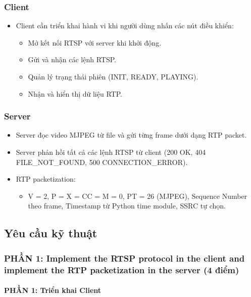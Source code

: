 \subsubsection{Client}
\begin{itemize}
    \item Client cần triển khai hành vi khi người dùng nhấn các nút điều khiển:
    \begin{itemize}
        \item Mở kết nối RTSP với server khi khởi động.
        \item Gửi và nhận các lệnh RTSP.
        \item Quản lý trạng thái phiên (INIT, READY, PLAYING).
        \item Nhận và hiển thị dữ liệu RTP.
    \end{itemize}
\end{itemize}

\subsubsection{Server}
\begin{itemize}
    \item Server đọc video MJPEG từ file và gửi từng frame dưới dạng RTP packet.
    \item Server phản hồi tất cả các lệnh RTSP từ client (200 OK, 404 FILE\_NOT\_FOUND, 500 CONNECTION\_ERROR).
    \item RTP packetization:
    \begin{itemize}
        \item V = 2, P = X = CC = M = 0, PT = 26 (MJPEG), Sequence Number theo frame, Timestamp từ Python time module, SSRC tự chọn.
    \end{itemize}
\end{itemize}

\subsection{Yêu cầu kỹ thuật}

\subsubsection{PHẦN 1: Implement the RTSP protocol in the client and implement the RTP packetization in the server (4 điểm)}
\paragraph{PHẦN 1: Triển khai Client}

